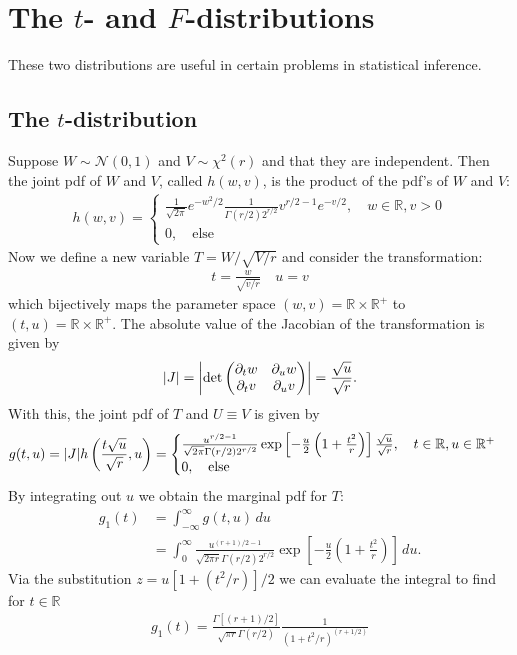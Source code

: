 \documentclass{book}
\theoremstyle{definition}
\newcommand{\p}{\partial}
\newcommand{\R}{\mathbb{R}}
\newcommand{\nn}{\nonumber}
\newcommand{\Else}{\text{else}}
\newcommand{\f}[2]{\frac{#1}{#2}}
\newcommand{\lp}{\left(}
\newcommand{\rp}{\right)}
\newcommand{\lb}{\left[}
\newcommand{\rb}{\right]}
\begin{document}
\section{The $t$- and $F$-distributions}


These two distributions are useful in certain problems in statistical inference. 

\subsection{The $t$-distribution}
Suppose $W \sim \mathcal{N}(0,1)$ and $V \sim \chi^2(r)$ and that they are independent. Then the joint pdf of $W$ and $V$, called $h(w,v)$, is the product of the pdf's of $W$ and $V$:
\begin{align}
h(w,v) = \begin{cases}
\f{1}{\sqrt{2\pi}}e^{-w^2/2}\f{1}{\Gamma(r/2)2^{r/2}}v^{r/2-1}e^{-v/2}, \quad w\in \R, v >0\\
0, \quad \Else
\end{cases}
\end{align}
Now we define a new variable $T = W/\sqrt{V/r}$ and consider the transformation:
\begin{align}
t = \f{w}{\sqrt{v/r}} \quad u=v
\end{align}
which bijectively maps the parameter space $(w,v) = \R\times \R^+$ to $(t,u)=\R \times \R^+$. The absolute value of the Jacobian of the transformation is given by
\begin{align}
\abs{J} = \abs{\det\begin{pmatrix}
	\p_tw & \p_u w\\
	\p_tv & \p_u v
	\end{pmatrix}} = \f{\sqrt{u}}{\sqrt{r}}.
\end{align} 
With this, the joint pdf of $T$ and $U \equiv V$ is given by
\begin{align}
g(t,u) =  \abs{J}h\lp \f{t\sqrt{u}}{\sqrt{r}},u \rp
= \begin{cases}
\f{u^{r/2-1}}{\sqrt{2\pi} \Gamma(r/2) 2^{r/2}}\exp\lb -\f{u}{2} \lp 1 + \f{t^2}{r} \rp \rb \f{\sqrt{u}}{\sqrt{r}}, \quad t\in \R, u \in \R^+\\
0,\quad \Else
\end{cases}
\end{align}
By integrating out $u$ we obtain the marginal pdf for $T$:
\begin{align}
g_1(t) &= \int^\infty_{-\infty}g(t,u)\,du \nn\\
&= \int^\infty_0 \f{u^{(r+1)/2-1}}{\sqrt{2\pi r} \Gamma(r/2) 2^{r/2}}\exp\lb -\f{u}{2} \lp 1 + \f{t^2}{r} \rp \rb \,du.
\end{align}
Via the substitution $z = u[1 + (t^2/r)]/2$ we can evaluate the integral to find for $t\in \R$
\begin{align}
\boxed{g_1(t) = \f{\Gamma[(r+1)/2]}{\sqrt{\pi r}\Gamma(r/2)}  \f{1}{(1 + t^2/r)^{(r+1/2)}} }
\end{align}
\end{document}
